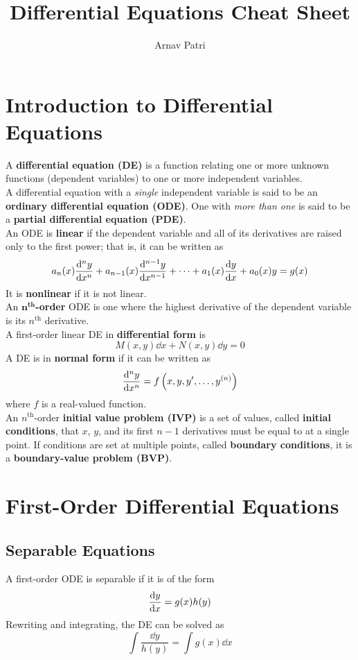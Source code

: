 \documentclass[12pt, A4]{article}
\title{Differential Equations Cheat Sheet}
\author{Arnav Patri}
\newcommand{\supt}[2]{#1^{\text{#2}}}
\begin{document}
	\maketitle
	\tableofcontents
	\section{Introduction to Differential Equations}
		A \textbf{differential equation (DE)} is a function relating one or more unknown functions (dependent variables) to one or more independent variables. \\
		A differential equation with a \textit{single} independent variable is said to be an \textbf{ordinary differential equation (ODE)}. One with \textit{more than one} is said to be a \textbf{partial differential equation (PDE)}. \\
		An ODE is \textbf{linear} if the dependent variable and all of its derivatives are raised only to the first power; that is, it can be written as
			\[a_n(x)\dv[n]{y}{x} + a_{n - 1}(x)\dv[n - 1]{y}{x} + \cdots + a_1(x)\dv{y}{x} + a_0(x)y = g(x)\]
			It is \textbf{nonlinear} if it is not linear. \\
		An \textbf{\(\bm{\supt{n}{th}}\)-order} ODE is one where the highest derivative of the dependent variable is its \(\supt{n}{th}\) derivative. \\
		A first-order linear DE in \textbf{differential form} is 
			\[M(x, y)\dd{x} + N(x, y)\dd{y} = 0\]
		A DE is in \textbf{normal form} if it can be written as
			\[\dv[n]{y}{x} = f\left(x, y, y', \ldots, y^{(n)}\right)\]
			where \(f\) is a real-valued function. \\
		An \(\supt{n}{th}\)-order \textbf{initial value problem (IVP)} is a set of values, called \textbf{initial conditions}, that \(x\), \(y\), and its first \(n - 1\) derivatives must be equal to at a single point. If conditions are set at multiple points, called \textbf{boundary conditions}, it is a \textbf{boundary-value problem (BVP)}.
	\section{First-Order Differential Equations}
		\subsection{Separable Equations}
			A first-order ODE is separable if it is of the form
				\[\dv{y}{x} = g(x)h(y)\]
				Rewriting and integrating, the DE can be solved as
				\[\int \frac{\dd{y}}{h(y)} = \int g(x)\dd{x}\]
\end{document}
